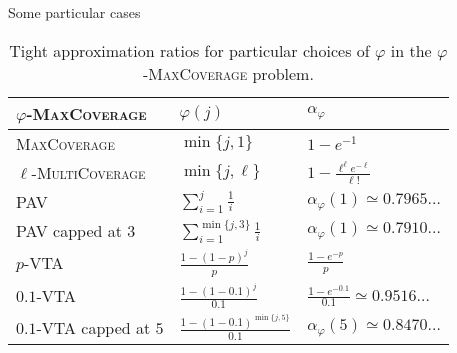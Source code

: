\documentclass{beamer}
\theoremstyle{definition}
\theoremstyle{remark}
\DeclareMathOperator{\Poi}{\text{Poi}}
\begin{document}

\begin{frame}{Some particular cases}
  \begin{table}[!h]
  \begin{center}
    \begin{tabular}{|l|l|l|}
      \hline
      $\varphi$-\textsc{MaxCoverage}  & $\varphi(j)$ & $\alpha_{\varphi}$ \\
      \hline
      \textsc{MaxCoverage} & $\min \{ j,1\}$ & $1 - e^{-1}$  \\
      $\ell$-\textsc{MultiCoverage} & $\min\{ j,\ell\}$ & $1-\frac{\ell^{\ell}e^{-\ell}}{\ell!}$ \\
       \textsc{PAV} & $\sum_{i=1}^j \frac{1}{i}$ & $\alpha_{\varphi}(1) \simeq 0.7965\ldots$\\
      \textsc{PAV} capped at $3$ & $\sum_{i=1}^{\min\{j,3\}} \frac{1}{i}$ & $\alpha_{\varphi}(1) \simeq 0.7910\ldots$ \\
      $p$-\textsc{VTA} & $\frac{1-(1-p)^j}{p}$ & $\frac{1 - e^{-p}}{p}$  \\
      $0.1$-\textsc{VTA} & $\frac{1-(1-0.1)^j}{0.1}$ & $\frac{1 - e^{-0.1}}{0.1} \simeq 0.9516\ldots$ \\
      $0.1$-\textsc{VTA} capped at $5$ & $\frac{1-(1-0.1)^{\min\{j,5\}}}{0.1}$ & $\alpha_{\varphi}(5) \simeq 0.8470\ldots$  \\
      \hline
    \end{tabular}
  \end{center}
  \caption{Tight approximation ratios for particular choices of $\varphi$ in the $\varphi$-\textsc{MaxCoverage} problem.}
  \label{figComp}
\end{table}
\end{frame}
\end{document}
